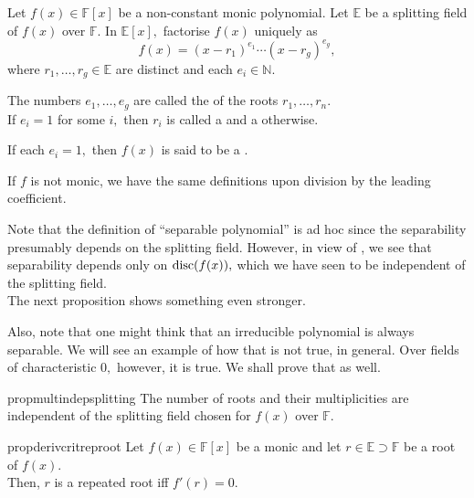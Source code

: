 \begin{defn}%
    Let $f(x) \in \mathbb{F}[x]$ be a non-constant monic polynomial. Let $\mathbb{E}$ be a splitting field of $f(x)$ over $\mathbb{F}.$ In $\mathbb{E}[x],$ factorise $f(x)$ uniquely as
    \begin{equation*} 
        f(x) = (x - r_1)^{e_1} \cdots (x - r_g)^{e_g},
    \end{equation*}
    where $r_1, \ldots, r_g \in \mathbb{E}$ are distinct and each $e_i \in \mathbb{N}.$ 

    The numbers $e_1, \ldots, e_g$ are called the  of the roots $r_1, \ldots, r_n.$ \\
    If $e_i = 1$ for some $i,$ then $r_i$ is called a  and a  otherwise.

    If each $e_i = 1,$ then $f(x)$ is said to be a .

    If $f$ is not monic, we have the same definitions upon division by the leading coefficient.
\end{defn}

\begin{rem}
    Note that the definition of ``separable polynomial'' is ad hoc since the separability presumably depends on the splitting field. However, in view of , we see that separability depends only on $\operatorname{disc}(f(x)),$ which we have seen to be independent of the splitting field.\\
    The next proposition shows something even stronger.

    Also, note that one might think that an irreducible polynomial is always separable. We will see an example of how that is not true, in general. Over fields of characteristic $0,$ however, it is true. We shall prove that as well.
\end{rem}

\begin{restatable}[]{prop}{multindepsplitting}
\label{prop:multindepsplitting}
    The number of roots and their multiplicities are independent of the splitting field chosen for $f(x)$ over $\mathbb{F}.$ \hfill\hyperref[prop:multindepsplitting2]{\downsym}
\end{restatable}

\begin{restatable}[]{prop}{derivcritreproot}
\label{prop:derivcritreproot}
    Let $f(x) \in \mathbb{F}[x]$ be a monic and let $r \in \mathbb{E} \supset \mathbb{F}$ be a root of $f(x).$ \\
    Then, $r$ is a repeated root iff $f'(r) = 0.$ \hfill\hyperref[prop:derivcritreproot2]{\downsym}
\end{restatable}

